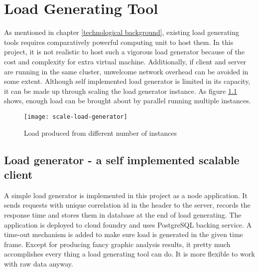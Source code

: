 \chapter{Load Generating Tool}
	\label{scale-load-generator}
As mentioned in chapter \ref{technological background}, existing load generating tools requires comparatively powerful computing unit to host them. In this project, it is not realistic to host such a vigorous load generator because of the cost and complexity for extra virtual machine. Additionally, if client and server are running in the same cluster, unwelcome network overhead can be avoided in some extent. Although self implemented load generator is limited in its capacity, it can be made up through scaling the load generator instance. As figure  \ref{scale-load-generator} shows, enough load can be brought about by parallel running multiple instances.
\begin{figure}[h]
	\centering
	\texttt{[image: scale-load-generator]}
	\caption{Load produced from different number of instances}
	\label{scale-load-generator}
\end{figure}

\section{Load generator - a self implemented scalable client}
A simple load generator is implemented in this project as a node application. It sends requests with unique correlation id in the header to the server, records the response time and stores them in database at the end of load generating. The application is deployed to cloud foundry and uses PostgreSQL backing service. A time-out mechanism is added to make sure load is generated in the given time frame. Except for producing fancy graphic analysis results, it pretty much accomplishes every thing a load generating tool can do. It is more flexible to work with raw data anyway.


